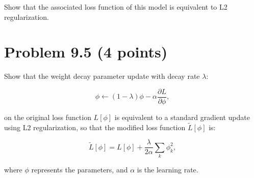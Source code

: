 \documentclass[10pt]{article}
\begin{document}
Show that the associated loss function of this model is equivalent to L2 regularization.

\vspace{3em}

\section*{Problem 9.5 (4 points)}

Show that the weight decay parameter update with decay rate $\lambda$:

\begin{equation}
    \phi \leftarrow (1 - \lambda) \phi - \alpha \frac{\partial L}{\partial \phi},
\end{equation}

\noindent on the original loss function $L[\phi]$ is equivalent to a standard
gradient update using L2 regularization, so that the modified loss function
$\tilde{L}[\phi]$ is:

\begin{equation}
    \tilde{L}[\phi] = L[\phi] + \frac{\lambda}{2\alpha} \sum_{k} \phi_k^2,
\end{equation}

where $\phi$ represents the parameters, and $\alpha$ is the learning rate.
\end{document}
